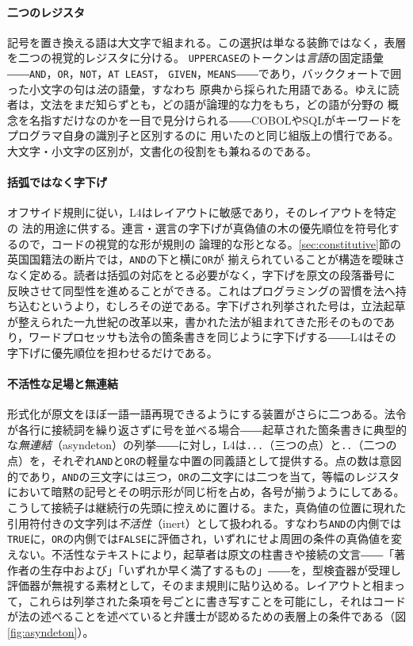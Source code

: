 \documentclass[11pt,a4paper]{ltjsarticle}
\newcommand{\bq}{\char96\relax}
\newcommand{\code}[1]{\texttt{\small #1}}
\begin{document}
\paragraph{二つのレジスタ}
記号を置き換える語は大文字で組まれる。この選択は単なる装飾ではなく，表層を二つの視覚的レジスタに分ける。
\code{UPPERCASE}のトークンは\emph{言語}の固定語彙――\code{AND}，\code{OR}，\code{NOT}，\code{AT LEAST}，
\code{GIVEN}，\code{MEANS}――であり，\bq バッククォートで囲った小文字の句\bq は\emph{法}の語彙，すなわち
原典から採られた用語である。ゆえに読者は，文法をまだ知らずとも，どの語が論理的な力をもち，どの語が分野の
概念を名指すだけなのかを一目で見分けられる――COBOLやSQLがキーワードをプログラマ自身の識別子と区別するのに
用いたのと同じ組版上の慣行である。大文字・小文字の区別が，文書化の役割をも兼ねるのである。

\paragraph{括弧ではなく字下げ}
オフサイド規則\cite{landin1966next700}に従い，L4はレイアウトに敏感であり，そのレイアウトを特定の
法的用途に供する。連言・選言の字下げが真偽値の木の優先順位を符号化するので，コードの視覚的な形が規則の
論理的な形となる。\ref{sec:constitutive}節の英国国籍法の断片では，\code{AND}の下と横に\code{OR}が
揃えられていることが構造を曖昧さなく定める。読者は括弧の対応をとる必要がなく，字下げを原文の段落番号に
反映させて同型性を進めることができる。これはプログラミングの習慣を法へ持ち込むというより，むしろその逆である。字下げされ列挙された号は，立法起草が整えられた一九世紀の改革以来，書かれた法が組まれてきた形そのものであり\cite{coode1843}，ワードプロセッサも法令の箇条書きを同じように字下げする――L4はその字下げに優先順位を担わせるだけである。

\paragraph{不活性な足場と無連結}
形式化が原文をほぼ一語一語再現できるようにする装置がさらに二つある。法令が各行に接続詞を繰り返さずに号を並べる場合――起草された箇条書きに典型的な\emph{無連結}（asyndeton）の列挙――に対し，L4は\code{...}（三つの点）と\code{..}（二つの点）を，それぞれ\code{AND}と\code{OR}の軽量な中置の同義語として提供する。点の数は意図的であり，\code{AND}の三文字には三つ，\code{OR}の二文字には二つを当て，等幅のレジスタにおいて暗黙の記号とその明示形が同じ桁を占め，各号が揃うようにしてある。こうして接続子は継続行の先頭に控えめに置ける。また，真偽値の位置に現れた引用符付きの文字列は\emph{不活性}（inert）として扱われる。すなわち\code{AND}の内側では\code{TRUE}に，\code{OR}の内側では\code{FALSE}に評価され，いずれにせよ周囲の条件の真偽値を変えない。不活性なテキストにより，起草者は原文の柱書きや接続の文言――「著作者の生存中および」「いずれか早く満了するもの」――を，型検査器が受理し評価器が無視する素材として，そのまま規則に貼り込める。レイアウトと相まって，これらは列挙された条項を号ごとに書き写すことを可能にし，それはコードが法の述べることを述べていると弁護士が認めるための表層上の条件である（図\ref{fig:asyndeton}）。
\end{document}
